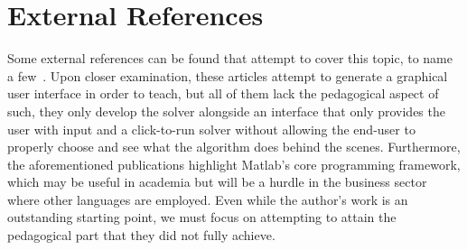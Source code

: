 \section{External References}
Some external references can be found that attempt to cover this topic, to name a few~\cite{BUldingMatlabGUI,vonDohlen2020,Kosasih,welfert1996applied}. Upon closer examination, these articles attempt to generate a graphical user interface in order to teach, but all of them lack the pedagogical aspect of such, they only develop the solver alongside an interface that only provides the user with input and a click-to-run solver without allowing the end-user to properly choose and see what the algorithm does behind the scenes. Furthermore, the aforementioned publications highlight Matlab's core programming framework, which may be useful in academia but will be a hurdle in the business sector where other languages are employed. Even while the author's work is an outstanding starting point, we must focus on attempting to attain the pedagogical part that they did not fully achieve.